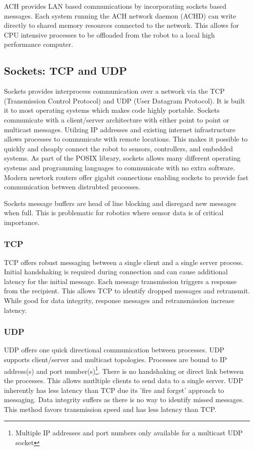 ACH provides LAN based communications by incorporating sockets based messages. Each system running the ACH network daemon (ACHD) can write directly to shared memory resources connected to the network\cite{ACHHUBO}. This allows for CPU intensive processes to be offloaded from the robot to a local high performance computer. 

\subsection{Sockets: TCP and UDP}

Sockets provides interprocess communication over a network via the TCP (Transmission Control Protocol) and UDP (User Datagram Protocol). It is built it to most operating systems which makes code highly portable. Sockets communicate with a client/server architecture with either point to point or multicast messages\cite{UDPMULTICAST}. Utilzing IP addresses and existing internet infrastructure allows processes to communicate with remote locations. This makes it possible to quickly and cheaply connect the robot to sensors, controllers, and embedded systems. As part of the POSIX library, sockets allows many different operating systems and programming languages to communicate with no extra software. Modern newtork routers offer gigabit connections enabling sockets to provide fast communication between distrubted processes.

Sockets message buffers are head of line blocking and disregard new messages when full. This is problematic for robotics where sensor data is of critical importance. 

\subsubsection{TCP}

TCP offers robust messaging between a single client and a single server process. Initial handshaking is required during connection and can cause additional latency for the initial message\cite{UDPTCP}. Each message transmission triggers a response from the recipient. This allows TCP to identify dropped messages and retransmit. While good for data integrity, response messages and retransmission increase latency. 

\subsubsection{UDP}

UDP offers one quick directional communication between processes. UDP supports client/server and multicast topologies. Processes are bound to IP address(s) and port number(s)\footnote{Multiple IP addresses and port numbers only available for a multicast UDP socket}. There is no handshaking or direct link between the processes. This allows mutltiple clients to send data to a single server. UDP inherently has less latency than TCP due its 'fire and forget' approach to messaging. Data integrity suffers as there is no way to identify missed messages. This method favors transmission speed and has less latency than TCP.

